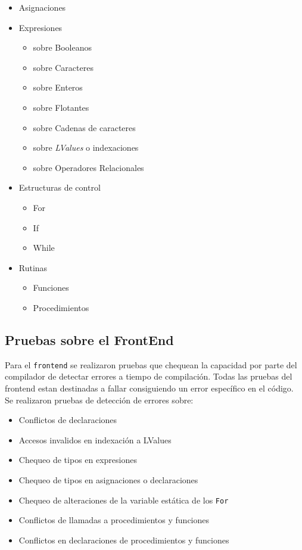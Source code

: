 \documentclass[12pt, spanish]{report}
\begin{document}
\begin{itemize}
\item Asignaciones
\item Expresiones
  \begin{itemize}
  \item sobre Booleanos
  \item sobre Caracteres
  \item sobre Enteros
  \item sobre Flotantes
  \item sobre Cadenas de caracteres
  \item sobre \emph{LValues} o indexaciones
  \item sobre Operadores Relacionales
  \end{itemize}
\item Estructuras de control
  \begin{itemize}
  \item For
  \item If
  \item While
  \end{itemize}
\item Rutinas
  \begin{itemize}
  \item Funciones
  \item Procedimientos
  \end{itemize}
\end{itemize}

\subsection{Pruebas sobre el FrontEnd}
\label{sec:pruebas:frontend}

Para el \texttt{frontend} se realizaron pruebas que chequean la
capacidad por parte del compilador de detectar errores a tiempo de
compilación. Todas las pruebas del frontend estan destinadas a fallar
consiguiendo un error específico en el código.\\

Se realizaron pruebas de detección de errores sobre:

\begin{itemize}
\item Conflictos de declaraciones
\item Accesos invalidos en indexación a LValues
\item Chequeo de tipos en expresiones
\item Chequeo de tipos en asignaciones o declaraciones
\item Chequeo de alteraciones de la variable estática de los \texttt{For}
\item Conflictos de llamadas a procedimientos y funciones
\item Conflictos en declaraciones de procedimientos y funciones
\end{itemize}
\end{document}
